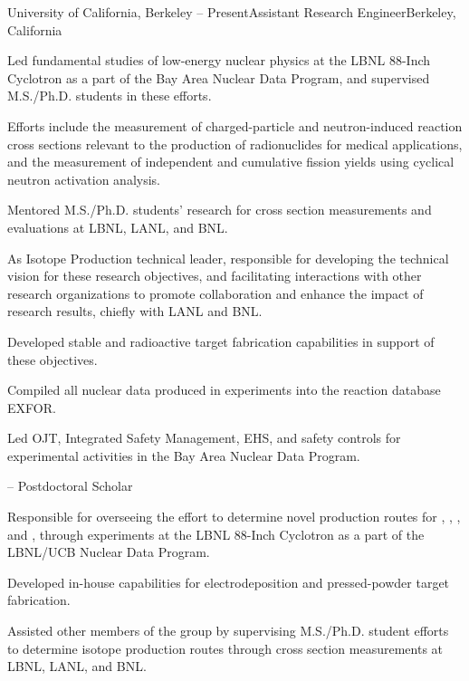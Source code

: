 \begin{rSubsection}{University of California, Berkeley}{ -- Present}{Assistant Research Engineer}{Berkeley, California}
\item Led fundamental studies of low-energy nuclear physics at the LBNL 88-Inch Cyclotron as a part of the Bay Area Nuclear Data Program,  and supervised M.S./Ph.D. students in these efforts.
\item Efforts include the measurement of charged-particle and neutron-induced reaction cross sections relevant to the production of radionuclides for medical applications, and the measurement of independent and cumulative fission yields using cyclical neutron activation analysis.
\item Mentored M.S./Ph.D. students' research for cross section measurements and evaluations at LBNL, LANL, and BNL.
\item As  Isotope Production technical leader, responsible for developing the technical vision for these research objectives, 
and facilitating interactions with other research organizations  to promote collaboration and enhance the impact of research results, chiefly with LANL and BNL. 
\item Developed stable and radioactive target fabrication capabilities in support of these objectives.
\item Compiled all nuclear data produced in  experiments into the reaction database EXFOR. 
\item Led OJT, Integrated Safety Management, EHS, and safety controls for experimental activities in the Bay Area Nuclear Data Program. 
\end{rSubsection}\vspace{-1.5\baselineskip}
\begin{rSubsection}{}{ -- }{Postdoctoral Scholar}{}
\item Responsible for overseeing the effort to determine novel production routes for , , , and , through experiments at the LBNL 88-Inch Cyclotron as a part of the LBNL/UCB Nuclear Data Program.
\item Developed in-house capabilities for electrodeposition and  pressed-powder target fabrication.
\item Assisted other members of the group by supervising M.S./Ph.D. student efforts to determine isotope production routes through cross section measurements at LBNL, LANL, and BNL.
\end{rSubsection}\vspace{-1.5\baselineskip}
